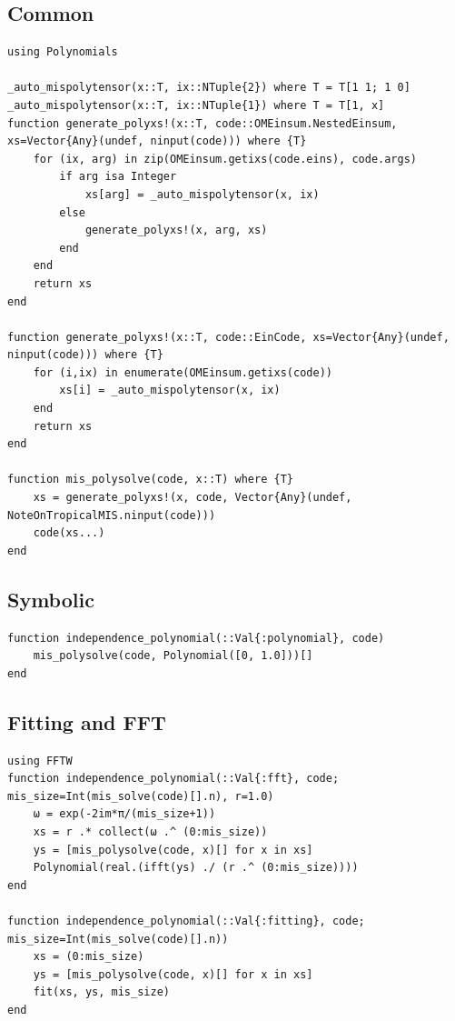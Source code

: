 \documentclass{article}
\newcommand{\<}{\langle}
\renewcommand{\>}{\rangle}
\theoremstyle{definition}\newtheorem{definition}{\textit{Definition}}
\begin{document}
\subsection{Common}
\begin{lstlisting}
using Polynomials

_auto_mispolytensor(x::T, ix::NTuple{2}) where T = T[1 1; 1 0]
_auto_mispolytensor(x::T, ix::NTuple{1}) where T = T[1, x]
function generate_polyxs!(x::T, code::OMEinsum.NestedEinsum, xs=Vector{Any}(undef, ninput(code))) where {T}
    for (ix, arg) in zip(OMEinsum.getixs(code.eins), code.args)
		if arg isa Integer
			xs[arg] = _auto_mispolytensor(x, ix)
		else
        	generate_polyxs!(x, arg, xs)
		end
    end
	return xs
end

function generate_polyxs!(x::T, code::EinCode, xs=Vector{Any}(undef, ninput(code))) where {T}
    for (i,ix) in enumerate(OMEinsum.getixs(code))
		xs[i] = _auto_mispolytensor(x, ix)
    end
	return xs
end

function mis_polysolve(code, x::T) where {T}
	xs = generate_polyxs!(x, code, Vector{Any}(undef, NoteOnTropicalMIS.ninput(code)))
	code(xs...)
end
\end{lstlisting}

\subsection{Symbolic}
\begin{lstlisting}
function independence_polynomial(::Val{:polynomial}, code)
    mis_polysolve(code, Polynomial([0, 1.0]))[]
end
\end{lstlisting}

\subsection{Fitting and FFT}
\begin{lstlisting}
using FFTW
function independence_polynomial(::Val{:fft}, code; mis_size=Int(mis_solve(code)[].n), r=1.0)
	ω = exp(-2im*π/(mis_size+1))
	xs = r .* collect(ω .^ (0:mis_size))
	ys = [mis_polysolve(code, x)[] for x in xs]
	Polynomial(real.(ifft(ys) ./ (r .^ (0:mis_size))))
end

function independence_polynomial(::Val{:fitting}, code; mis_size=Int(mis_solve(code)[].n))
	xs = (0:mis_size)
	ys = [mis_polysolve(code, x)[] for x in xs]
	fit(xs, ys, mis_size)
end
\end{lstlisting}
\end{document}
